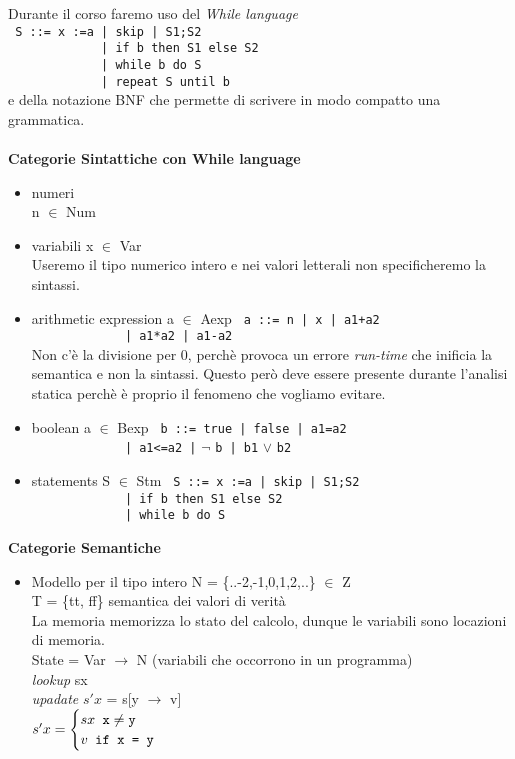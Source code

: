 \documentclass[10pt,                    %
               a4paper,                 %
               twoside,                 %
               openright,               %
               english,                 
               italian,                 
               ]{book}
\begin{document}
\noindent
Durante il corso faremo uso  del \textit{While language}\\
\noindent
\verb! S ::= x :=a | skip | S1;S2!\\
\verb!             | if b then S1 else S2!\\
\verb!             | while b do S!\\
\verb!             | repeat S until b!\\
e della notazione BNF che permette di scrivere in modo compatto una grammatica.
\\\\
\textbf{Categorie Sintattiche con While language}
\begin{itemize}
\item numeri \\
n $\in$ Num 

\item variabili
x $\in$ Var\\
Useremo il tipo numerico intero e nei valori letterali non specificheremo la sintassi.
\item arithmetic expression
a $\in$ Aexp
\verb! a ::= n | x | a1+a2!\\
\verb!             | a1*a2 | a1-a2!\\
Non c'\`e la divisione per 0, perch\`e provoca un errore \textit{run-time} che inificia la semantica e non la sintassi. Questo per\`o deve essere presente durante l'analisi statica perch\`e \`e proprio il fenomeno che vogliamo evitare.
\item boolean
a $\in$ Bexp
\verb! b ::= true | false | a1=a2!\\
\verb!             | a1<=a2 |! $\lnot$ \verb!b | b1! $\lor$ \verb!b2!\\
\item statements
S $\in$ Stm
\verb! S ::= x :=a | skip | S1;S2!\\
\verb!             | if b then S1 else S2!\\
\verb!             | while b do S!\\


\end{itemize}
\textbf{Categorie Semantiche}
\begin{itemize}
\item Modello per il tipo intero
N = \{..-2,-1,0,1,2,..\} $\in$ Z\\
T = \{tt, ff\} semantica dei valori di verit\`a\\
La memoria memorizza lo stato del calcolo, dunque le variabili sono locazioni di memoria.\\
State =  Var $\rightarrow$ N  (variabili che occorrono in un programma) \\
\textit{lookup}  sx\\
\textit{upadate} $s'x$ = s[y $\rightarrow$ v]\\
$s'x =
\begin{cases}
sx\verb! x! \ne \verb!y! \\ v \verb! if x = y!
\end{cases}
$\\

\end{itemize}
\end{document}
